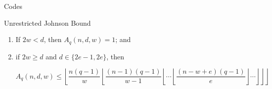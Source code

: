 \documentclass{beamer}
\begin{document}
 \begin{frame}{Codes}
  
  \begin{block}{Unrestricted Johnson Bound}
   \begin{enumerate}
   \item If $2w < d$, then $A_q(n,d,w) = 1$; and
   \item if $2w \geq d$ and $d \in \{2e-1,2e\}$, then
   \begin{small}
   $$
   A_q(n,d,w) \leq \left\lfloor \frac{n(q-1)}{w} \left\lfloor \frac{(n-1)(q-1)}{w-1} \left\lfloor \cdots \left\lfloor \frac{(n-w+e)(q-1)}{e} \right\rfloor \cdots \right\rfloor\right\rfloor\right\rfloor
   $$
   \end{small}
   \end{enumerate}
  \end{block}

 \end{frame}
 
\end{document}

